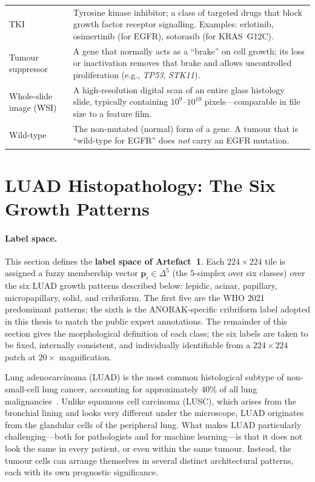 \begin{table}[ht!]
\begin{tabular}{p{3.8cm} p{9.2cm}}
TKI & Tyrosine kinase inhibitor; a class of targeted drugs that block growth factor receptor signalling. Examples: erlotinib, osimertinib (for EGFR), sotorasib (for KRAS~G12C). \\
Tumour suppressor & A gene that normally acts as a ``brake'' on cell growth; its loss or inactivation removes that brake and allows uncontrolled proliferation (e.g., \textit{TP53}, \textit{STK11}). \\
Whole-slide image (WSI) & A high-resolution digital scan of an entire glass histology slide, typically containing $10^9$--$10^{10}$ pixels---comparable in file size to a feature film. \\
Wild-type & The non-mutated (normal) form of a gene. A tumour that is ``wild-type for EGFR'' does \emph{not} carry an EGFR mutation. \\
\hline
\end{tabular}
\end{table}


\section{LUAD Histopathology: The Six Growth Patterns}
\label{sec:uc:luad_histology}

\paragraph{Label space.}
This section defines the \textbf{label space of Artefact~1}.
Each $224\times 224$ tile is assigned a fuzzy membership vector
$\mathbf{p}_i \in \Delta^5$ (the 5-simplex over six classes) over the
six LUAD growth patterns described below: lepidic, acinar, papillary,
micropapillary, solid, and cribriform.
The first five are the WHO 2021 predominant patterns; the sixth is
the ANORAK-specific cribriform label adopted in this thesis to match
the public expert annotations.
The remainder of this section gives the morphological definition
of each class; the six labels are taken to be fixed, internally
consistent, and individually identifiable from a
$224\times 224$ patch at $20\times$ magnification.

\bigskip

Lung adenocarcinoma (LUAD) is the most common histological subtype of non-small-cell lung cancer, accounting for approximately 40\% of all lung malignancies~\cite{who2021thoracic}.
Unlike squamous cell carcinoma (LUSC), which arises from the bronchial lining and looks very different under the microscope, LUAD originates from the glandular cells of the peripheral lung.
What makes LUAD particularly challenging---both for pathologists and for machine learning---is that it does not look the same in every patient, or even within the same tumour.
Instead, the tumour cells can arrange themselves in several distinct architectural patterns, each with its own prognostic significance.


